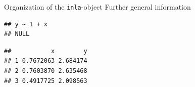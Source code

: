 \documentclass[
  ignorenonframetext,
]{beamer}
\newenvironment{Shaded}{\begin{snugshade}}{\end{snugshade}}
\newcommand{\CommentTok}[1]{\textcolor[rgb]{0.56,0.35,0.01}{\textit{#1}}}
\newcommand{\DecValTok}[1]{\textcolor[rgb]{0.00,0.00,0.81}{#1}}
\newcommand{\NormalTok}[1]{#1}
\newcommand{\SpecialCharTok}[1]{\textcolor[rgb]{0.00,0.00,0.00}{#1}}
\begin{document}
\begin{frame}[fragile]{Organization of the \texttt{inla}-object}
\protect\hypertarget{organization-of-the-inla-object-3}{}
Further general information

\begin{Shaded}
\end{Shaded}

\begin{verbatim}
## y ~ 1 + x
## NULL
\end{verbatim}

\begin{Shaded}
\end{Shaded}

\begin{verbatim}
##           x        y
## 1 0.7672063 2.684174
## 2 0.7603870 2.635468
## 3 0.4917725 2.098563
\end{verbatim}

\begin{Shaded}
\end{Shaded}
\end{frame}
\end{document}
